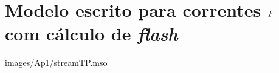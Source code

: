 %
%
%
\chapter{Modelo escrito para correntes $\emph{F}$ com cálculo de
\textit{flash}}
\label{chap:streamTP}

 {images/Ap1/streamTP.mso}

